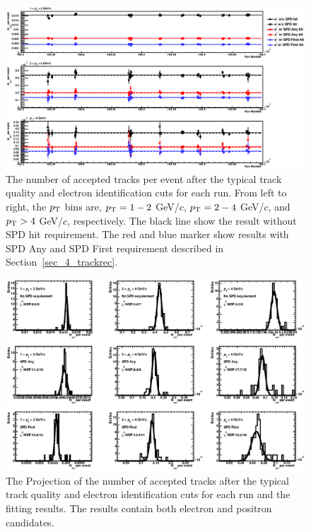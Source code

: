 \begin{figure}[!h]
  \centering
  \includegraphics[width=16cm]{chap4/figure/QA/RunbyRunQA_MB.eps}
  \caption{The number of accepted tracks per event after the typical track quality and electron identification cuts for each run. From left to right, the $p_{\rm{T}}$ bins are, $p_{\rm{T}}=1-2$ GeV/$c$, $p_{\rm{T}}=2-4$ GeV/$c$, and $p_{\rm{T}}>4$ GeV/$c$, respectively. The black line show the result without SPD hit requirement. The red and blue marker show results with SPD Any and SPD First requirement described in Section~\ref{sec_4_trackrec}. }
  \label{fig_4_runqa_MB}
\end{figure}
\begin{figure}[!h]
  \centering
  \includegraphics[width=16cm]{chap4/figure/QA/RunbyRunQAPro_MB.eps}
  \caption{The Projection of the number of accepted tracks after the typical track quality and electron identification cuts for each run and the fitting results. The results contain both electron and positron candidates. }
  \label{fig_4_runqapro_MB}
\end{figure}

